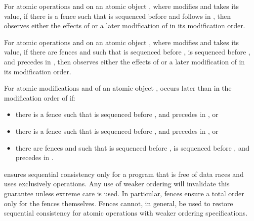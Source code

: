 \pnum
For atomic operations  and  on an atomic object , where
 modifies  and  takes its value, if there is a
 fence  such that  is sequenced before
 and  follows  in , then  observes
either the effects of  or a later modification of  in its
modification order.

\pnum
For atomic operations  and  on an atomic object , where
 modifies  and  takes its value, if there are
 fences  and  such that  is
sequenced before ,  is sequenced before , and 
precedes  in , then  observes either the effects of
 or a later modification of  in its modification order.

\pnum
For atomic modifications  and  of an atomic object ,
 occurs later than  in the modification order of  if:

\begin{itemize}
\item there is a  fence  such that 
is sequenced before , and  precedes  in , or
\item there is a  fence  such that 
is sequenced before , and  precedes  in , or
\item there are  fences  and  such that 
is sequenced before ,  is sequenced before ,
and  precedes  in .
\end{itemize}


\pnum
\begin{note}  ensures sequential consistency only for a
program that is free of data races and uses exclusively 
operations. Any use of weaker ordering will invalidate this guarantee unless extreme
care is used. In particular,  fences ensure a total order
only for the fences themselves. Fences cannot, in general, be used to restore sequential
consistency for atomic operations with weaker ordering specifications. \end{note}

